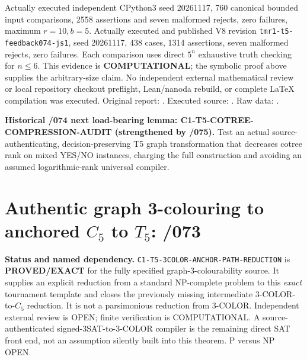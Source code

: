 \documentclass[11pt]{article}
\begin{document}
Actually executed independent CPython3 seed 20261117, 760
canonical bounded input comparisons, 2558 assertions and seven
malformed rejects, zero failures, maximum $r=10,b=5$.
Actually executed and published V8 revision
\texttt{tmr1-t5-feedback074-js1}, seed 20261117, 438 cases,
1314 assertions, seven malformed rejects, zero failures.
Each comparison uses direct $5^n$ exhaustive truth checking
for $n\le6$. This evidence is \textbf{COMPUTATIONAL};
the symbolic proof above supplies the arbitrary-size claim.
No independent external mathematical review or local repository
checkout preflight, Lean/nanoda rebuild, or complete
LaTeX compilation was executed. Original report:
.
Executed source:
.
Raw data:
.

\textbf{Historical /074 next load-bearing lemma:
C1-T5-COTREE-COMPRESSION-AUDIT (strengthened by /075).}
Test an actual source-authenticating, decision-preserving
T5 graph transformation that decreases cotree rank on mixed
YES/NO instances, charging the full construction and avoiding
an assumed logarithmic-rank universal compiler.

\section{Authentic graph 3-colouring to anchored $C_5$ to $T_5$: /073}

\noindent\textbf{Status and named dependency.}
\texttt{C1-T5-3COLOR-ANCHOR-PATH-REDUCTION} is
\textbf{PROVED/EXACT} for the fully specified graph-3-colourability
source. It supplies an explicit reduction from a standard NP-complete
problem to this \emph{exact} tournament template and closes the
previously missing intermediate 3-COLOR-to-$C_5$ reduction. It is not
a parsimonious reduction from 3-COLOR. Independent external review is
OPEN; finite verification is COMPUTATIONAL. A source-authenticated
signed-3SAT-to-3-COLOR compiler is the remaining direct SAT front end,
not an assumption silently built into this theorem. P versus NP OPEN.
\end{document}

